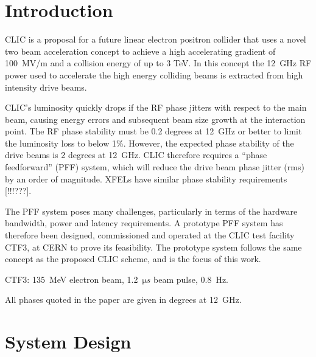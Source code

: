 \documentclass[%
 reprint,
 amsmath,amssymb,
 aps,
]{revtex4-1}
\begin{document}

\section{\label{s:intro}Introduction}

CLIC is a proposal for a future linear electron positron collider that uses a 
novel two 
beam acceleration concept to achieve a high accelerating gradient of 100~MV/m 
and a collision energy of up to 3 TeV. In this concept the 12~GHz RF power used 
to accelerate the high energy colliding beams is extracted from high intensity 
drive beams.

CLIC's luminosity quickly drops if the RF phase jitters with respect to the 
main beam, causing energy errors and subsequent beam size growth at the 
interaction point. The RF phase 
stability must be 0.2 degrees at 12~GHz or better to limit the luminosity loss 
to below 1\%.  However, the expected phase stability of the drive beams is 2 
degrees at 12~GHz. CLIC therefore requires a ``phase feedforward'' (PFF) 
system, which will reduce the drive beam phase jitter (rms) by an order of 
magnitude. XFELs have similar phase stability requirements [!!!???].

The PFF system poses many challenges, particularly in terms of the hardware 
bandwidth, power and latency requirements. A prototype PFF system has therefore 
been designed, commissioned and operated at the CLIC 
test facility CTF3, at CERN to prove its feasibility. The prototype system 
follows the same concept as the proposed CLIC scheme, and is the focus of this 
work. 

CTF3: 135~MeV electron beam, 1.2~\(\mathrm{\mu}s\) beam pulse, 0.8~Hz.

All phases quoted in the paper are given in degrees at 12~GHz.

\section{\label{s:ctfLayout}System Design}
\end{document}

